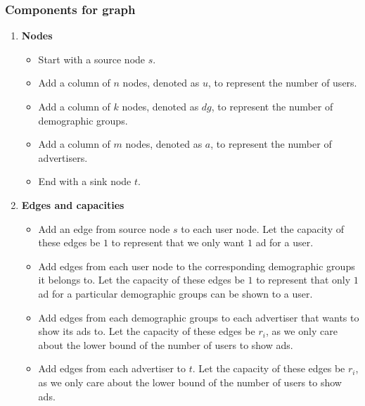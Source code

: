 \documentclass[11pt]{scrartcl}
\begin{document}
\subsubsection{
	Components for graph
}
\begin{enumerate}[label=\alph*.]
	\item{
	      \textbf{Nodes}
	      \begin{itemize}
		      \item Start with a source node $s$.
		      \item Add a column of $n$ nodes, denoted as $u$, to represent the number of users.
		      \item Add a column of $k$ nodes, denoted as $dg$, to represent the number of demographic groups.
		      \item Add a column of $m$ nodes, denoted as $a$, to represent the number of advertisers.
		      \item End with a sink node $t$.
	      \end{itemize}
	      }
	\item{
	      \textbf{Edges and capacities}
	      \begin{itemize}
		      \item{
		            Add an edge from source node $s$ to each user node. Let the capacity of these edges be $1$ to
		            represent that we only want $1$ ad for a user.
		            }
		      \item {
		            Add edges from each user node to the corresponding demographic groups it belongs to.
		            Let the capacity of these edges be $1$ to represent that only $1$ ad for a particular
		            demographic groups can be shown to a user.
		            }
		      \item {
		            Add edges from each demographic groups to each advertiser that wants to show its ads to.
		            Let the capacity of these edges be $r_i$, as we only care about the lower bound of the number of
		            users to show ads.
		            }
		      \item {
		            Add edges from each advertiser to $t$. Let the capacity of these edges be $r_i$,
		            as we only care about the lower bound of the number of
		            users to show ads.
		            }
	      \end{itemize}
	      }
\end{enumerate}
\end{document}
